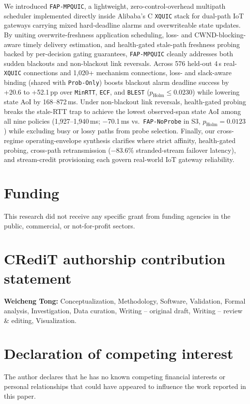 \documentclass[preprint,12pt,number]{elsarticle}
\begin{document}
We introduced \texttt{FAP-MPQUIC}, a lightweight, zero-control-overhead multipath scheduler implemented directly inside Alibaba's C \texttt{XQUIC} stack for dual-path IoT gateways carrying mixed hard-deadline alarms and overwriteable state updates. By uniting overwrite-freshness application scheduling, loss- and CWND-blocking-aware timely delivery estimation, and health-gated stale-path freshness probing backed by per-decision gating guarantees, \texttt{FAP-MPQUIC} cleanly addresses both sudden blackouts and non-blackout link reversals. Across 576 held-out 4\,s real-\texttt{XQUIC} connections and 1,020+ mechanism connections, loss- and slack-aware binding (shared with \texttt{Prob-Only}) boosts blackout alarm deadline success by +20.6 to +52.1\,pp over \texttt{MinRTT}, \texttt{ECF}, and \texttt{BLEST} ($p_{\text{Holm}} \le 0.0230$) while lowering state AoI by 168--872\,ms. Under non-blackout link reversals, health-gated probing breaks the stale-RTT trap to achieve the lowest observed-span state AoI among all nine policies (1,927--1,940\,ms; $-$70.1\,ms vs.\ \texttt{FAP-NoProbe} in S3, $p_{\text{Holm}}=0.0123$) while excluding busy or lossy paths from probe selection. Finally, our cross-regime operating-envelope synthesis clarifies where strict affinity, health-gated probing, cross-path retransmission ($-$83.6\% stranded-stream failover latency), and stream-credit provisioning each govern real-world IoT gateway reliability.

\FloatBarrier

\section*{Funding}
This research did not receive any specific grant from funding agencies in the public, commercial, or not-for-profit sectors.

\section*{CRediT authorship contribution statement}
\textbf{Weicheng Tong:} Conceptualization, Methodology, Software, Validation, Formal analysis, Investigation, Data curation, Writing -- original draft, Writing -- review \& editing, Visualization.

\section*{Declaration of competing interest}
The author declares that he has no known competing financial interests or personal relationships that could have appeared to influence the work reported in this paper.
\end{document}
